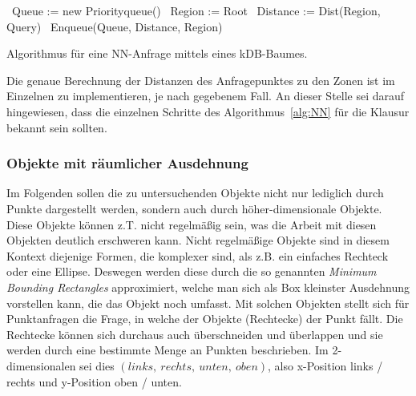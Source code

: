\begin{algorithm}[htb]
	\SetAlgoLined
	\DontPrintSemicolon
	\BlankLine
	\BlankLine
	\ {Queue := new Priorityqueue()}\;
	\ {Region := Root}\;
	\ {Distance := Dist(Region, Query)}\;
	\ {Enqueue(Queue, Distance, Region)}\;
	\BlankLine
	\BlankLine
	\caption{Algorithmus für eine NN-Anfrage mittels eines kDB-Baumes.\label{alg:NN}}
\end{algorithm}


Die genaue Berechnung der Distanzen des Anfragepunktes zu den Zonen ist im Einzelnen
zu implementieren, je nach gegebenem Fall. An dieser Stelle sei darauf hingewiesen,
dass die einzelnen Schritte des Algorithmus~\ref{alg:NN} für die Klausur bekannt sein
sollten.

\subsubsection{Objekte mit räumlicher Ausdehnung}
Im Folgenden sollen die zu untersuchenden Objekte nicht nur lediglich durch Punkte
dargestellt werden, sondern auch durch höher-dimensionale Objekte. Diese Objekte
können z.T. nicht regelmäßig sein, was die Arbeit mit diesen Objekten deutlich
erschweren kann. 
Nicht regelmäßige Objekte sind in diesem Kontext diejenige Formen, die komplexer sind,
als z.B. ein einfaches Rechteck oder eine Ellipse.
Deswegen werden diese durch die so genannten \textit{Minimum
Bounding Rectangles} approximiert, welche man sich als Box kleinster
Ausdehnung vorstellen kann, die das Objekt noch umfasst. Mit solchen Objekten
stellt sich für Punktanfragen die Frage, in welche der Objekte (Rechtecke) der
Punkt fällt. Die Rechtecke können sich durchaus auch überschneiden und überlappen
und sie werden durch eine bestimmte Menge an Punkten beschrieben. Im 2-dimensionalen
sei dies \((links,\ rechts,\ unten,\ oben)\), also x-Position links / rechts und 
y-Position oben / unten. 

